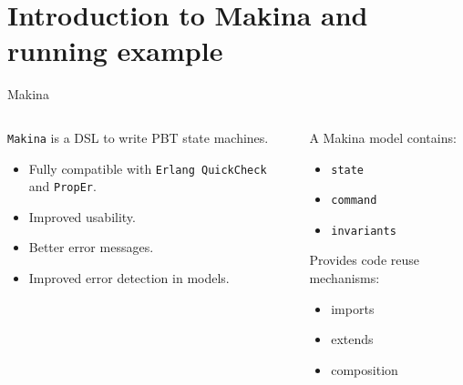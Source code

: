 \documentclass[aspectratio=169, 10pt]{beamer}
\begin{document}
\section{Introduction to Makina and running example}
\label{sec:org2d1a99b}
\begin{frame}[label={sec:orga1b4e10},fragile]{Makina}
 \begin{columns}
\begin{column}{0.48\columnwidth}
\onslide<+->
\texttt{Makina} is a DSL to write PBT state machines.
\onslide<+->
\begin{itemize}
\item Fully compatible with \texttt{Erlang QuickCheck} and \texttt{PropEr}.
\onslide<+->
\item Improved usability.
\onslide<+->
\item Better error messages.
\onslide<+->
\item Improved error detection in models.
\end{itemize}
\end{column}

\begin{column}{0.48\columnwidth}
\onslide<+->
A Makina model contains:
\onslide<+->
\begin{itemize}
\item \texttt{state}
\onslide<+->
\item \texttt{command}
\onslide<+->
\item \texttt{invariants}
\onslide<+->
\end{itemize}

\vspace{10pt}

Provides code reuse mechanisms:
\onslide<+->
\begin{itemize}
\item imports
\onslide<+->
\item extends
\onslide<+->
\item composition
\end{itemize}
\end{column}
\end{columns}
\end{frame}
\end{document}

